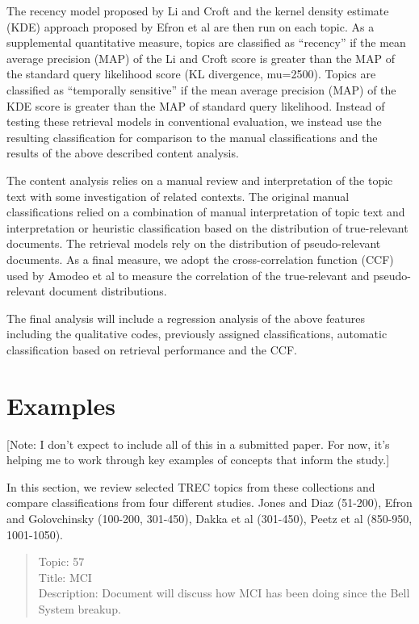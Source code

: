 \documentclass{sig-alternate}
\begin{document}
The recency model proposed by Li and Croft \cite{Li2003} and the kernel density estimate (KDE) approach proposed by Efron et al \cite{Efron2014} are then run on each topic.  As a supplemental quantitative measure, topics are classified as ``recency'' if the mean average precision (MAP) of the Li and Croft score is greater than the MAP of the standard query likelihood score (KL divergence, mu=2500). Topics are classified as ``temporally sensitive'' if the mean average precision (MAP) of the KDE score is greater than the MAP of standard query likelihood. Instead of testing these retrieval models in conventional evaluation, we instead use the resulting classification for comparison to the manual classifications and the results of the above described content analysis.

The content analysis relies on a manual review and interpretation of the topic text with some investigation of related contexts. The original manual classifications relied on a combination of manual interpretation of topic text and interpretation or heuristic classification based on the distribution of true-relevant documents. The retrieval models rely on the distribution of pseudo-relevant documents.  As a final measure, we adopt the cross-correlation function (CCF) used by Amodeo et al \cite{Amodeo2011} to measure the correlation of the true-relevant and pseudo-relevant document distributions. 

The final analysis will include a regression analysis of the above features including the qualitative codes, previously assigned classifications, automatic classification based on retrieval performance and the CCF.

\section{Examples}

[Note: I don't expect to include all of this in a submitted paper.  For now, it's helping me to work through key examples of concepts that inform the study.]

In this section, we review selected TREC topics from these collections and compare classifications from four different studies.  Jones and Diaz (51-200), Efron and Golovchinsky (100-200, 301-450), Dakka et al (301-450), Peetz et al (850-950, 1001-1050).

\begin{quote}
Topic: 57\\
Title: MCI\\
Description: Document will discuss how MCI has been doing since the Bell System breakup.
\end{quote}
\end{document}

